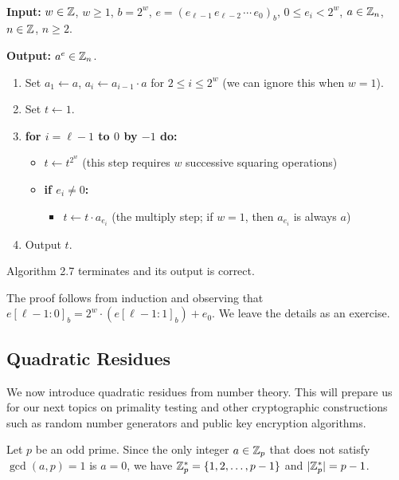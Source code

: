 \begin{algo}~

{\bf Input:} $w \in \mathbb{Z}$, $w \geq 1$, $b = 2^w$, $e = (e_{\ell-1}\,e_{\ell-2}\,\cdots\,e_0)_b$, 
$0 \leq e_i < 2^w$, $a \in \mathbb{Z}_n$, $n \in \mathbb{Z}$, $n \geq 2$.

{\bf Output:} $a^e \in \mathbb{Z}_n$. 
\begin{enumerate}
    \item Set $a_1 \gets a$, $a_i \gets a_{i-1} \cdot a$ for $2 \leq i \leq 2^w$ (we can ignore this when $w = 1$). 
    \item Set $t \gets 1$. 
    \item {\bf for $i = \ell - 1$ to $0$ by $-1$ do:}
    \begin{itemize}
        \item $t \gets t^{2^w}$ (this step requires $w$ successive squaring operations)
        \item {\bf if $e_i \neq 0$:} 
        \begin{itemize}[$\circ$]
            \item $t \gets t \cdot a_{e_i}$ (the multiply step; if $w = 1$, then $a_{e_i}$ is always $a$)
        \end{itemize}
    \end{itemize}
    \item Output $t$. 
\end{enumerate}
\end{algo}

\newpage
\begin{thm}
Algorithm 2.7 terminates and its output is correct.
\end{thm}
\begin{pf}
The proof follows from induction and observing that $e[\ell-1 : 0]_b = 2^w \cdot (e[\ell-1 : 1]_b) + e_0$. 
We leave the details as an exercise. 
\end{pf}

\subsection{Quadratic Residues}
We now introduce quadratic residues from number theory. This will prepare us for our next 
topics on primality testing and other cryptographic constructions such as random number generators 
and public key encryption algorithms. 

Let $p$ be an odd prime. Since the only integer $a \in \mathbb{Z}_p$ that does not satisfy $\gcd(a, p) = 1$ is 
$a = 0$, we have $\mathbb{Z}_p^* = \{1, 2, \dots, p-1\}$ and $|\mathbb{Z}_p^*| = p-1$. 

